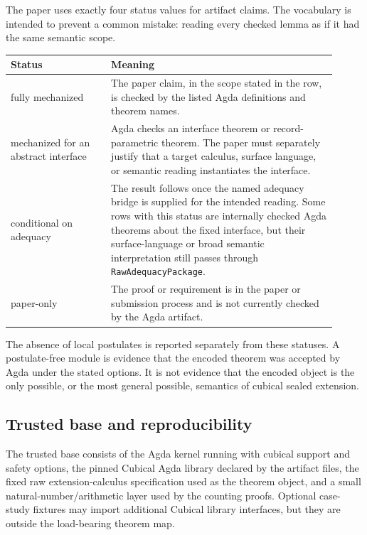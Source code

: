\documentclass{lmcs}
\begin{document}
The paper uses exactly four status values for artifact claims.  The vocabulary is intended to
prevent a common mistake: reading every checked lemma as if it had the same semantic scope.

\begin{center}
\small
\setlength{\tabcolsep}{3pt}
\begin{tabular}{p{0.28\linewidth}p{0.63\linewidth}}
\hline
Status & Meaning \\
\hline
fully mechanized
& The paper claim, in the scope stated in the row, is checked by the listed Agda definitions and
theorem names. \\
\hline
mechanized for an abstract interface
& Agda checks an interface theorem or record-parametric theorem.  The paper must separately
justify that a target calculus, surface language, or semantic reading instantiates the
interface. \\
\hline
conditional on adequacy
& The result follows once the named adequacy bridge is supplied for the intended reading.  Some
rows with this status are internally checked Agda theorems about the fixed interface, but their
surface-language or broad semantic interpretation still passes through
\texttt{RawAdequacyPackage}. \\
\hline
paper-only
& The proof or requirement is in the paper or submission process and is not currently checked by
the Agda artifact. \\
\hline
\end{tabular}
\end{center}

The absence of local postulates is reported separately from these statuses.  A postulate-free
module is evidence that the encoded theorem was accepted by Agda under the stated options.  It
is not evidence that the encoded object is the only possible, or the most general possible,
semantics of cubical sealed extension.

\subsection{Trusted base and reproducibility}
\label{subsec:trusted-base-reproducibility}

The trusted base consists of the Agda kernel running with cubical support and safety options,
the pinned Cubical Agda library declared by the artifact files, the fixed raw
extension-calculus specification used as the theorem object, and a small
natural-number/arithmetic layer used by the counting proofs.  Optional case-study fixtures may
import additional Cubical library interfaces, but they are outside the load-bearing theorem map.
\end{document}
